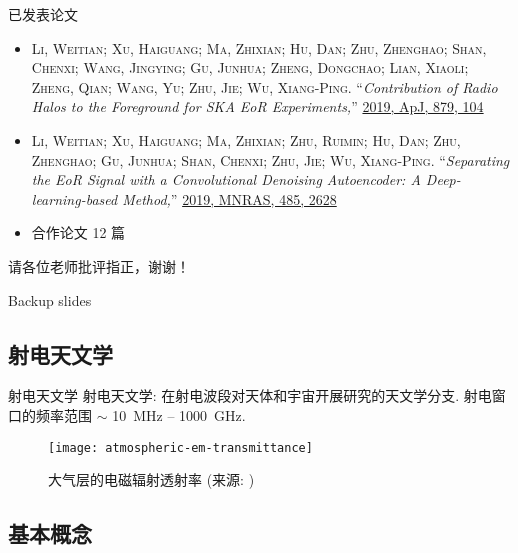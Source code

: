 \documentclass{beamer}
\begin{document}
\begin{frame}{已发表论文}
  \small
  \begin{itemize}
    \item
      \textsc{\alert{Li, Weitian}; Xu, Haiguang; Ma, Zhixian; Hu, Dan;
      Zhu, Zhenghao; Shan, Chenxi; Wang, Jingying; Gu, Junhua;
      Zheng, Dongchao; Lian, Xiaoli; Zheng, Qian; Wang, Yu;
      Zhu, Jie; Wu, Xiang-Ping}.
      \enquote{\it Contribution of Radio Halos to the Foreground for
        SKA EoR Experiments,}
      \href{http://adsabs.harvard.edu/abs/2019ApJ...879..104L}{%
        2019, ApJ, 879, 104}
    \item
      \textsc{\alert{Li, Weitian}; Xu, Haiguang; Ma, Zhixian; Zhu, Ruimin;
      Hu, Dan; Zhu, Zhenghao; Gu, Junhua; Shan, Chenxi; Zhu, Jie;
      Wu, Xiang-Ping}.
      \enquote{\it Separating the EoR Signal with a Convolutional Denoising
        Autoencoder: A Deep-learning-based Method,}
      \href{http://adsabs.harvard.edu/abs/2019MNRAS.485.2628L}{%
        2019, MNRAS, 485, 2628}
    \item
      合作论文 12 篇
  \end{itemize}
\end{frame}

\begin{frame}[standout]
  \huge 请各位老师批评指正，谢谢！
\end{frame}


\appendix

\begin{frame}[standout]
  Backup slides
\end{frame}

\subsection{射电天文学}

\begin{frame}{射电天文学}
  \alert{射电天文学}:
  在射电波段对天体和宇宙开展研究的天文学分支.
  \alert{射电窗口}的频率范围 $\sim$ \SI{10}{\MHz} -- \SI{1000}{\GHz}.

  \begin{figure}
    \centering
    \texttt{[image: atmospheric-em-transmittance]}
    \caption{大气层的电磁辐射透射率 (来源: \cite{condon2016})}
  \end{figure}
\end{frame}

\subsection{基本概念}
\end{document}
